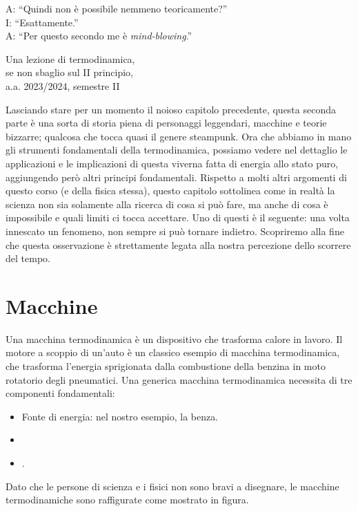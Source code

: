 \marginpar{\minitoc}

\epigraph{A: ``Quindi non è possibile nemmeno teoricamente?''\\I: ``Esattamente.''\\A: ``Per questo secondo me è \emph{mind-blowing}.''}{Una lezione di termodinamica,\\se non sbaglio sul II principio,\\a.a. 2023/2024, semestre II}

Lasciando stare per un momento il noioso capitolo precedente,
questa seconda parte è una sorta di storia piena di personaggi
leggendari, macchine e teorie bizzarre; qualcosa che tocca
quasi il genere steampunk. Ora che abbiamo in mano gli strumenti
fondamentali della termodinamica, possiamo vedere nel
dettaglio le applicazioni e le implicazioni di questa viverna
fatta di energia allo stato puro, aggiungendo però altri
principi fondamentali. Rispetto a molti altri
argomenti di questo corso (e della fisica stessa), questo
capitolo sottolinea come in realtà la scienza non sia
solamente alla ricerca di cosa si può fare, ma anche di
cosa è impossibile e quali limiti ci tocca accettare. Uno
di questi è il seguente: una
volta innescato un fenomeno, non sempre si può tornare indietro.
Scopriremo alla fine che questa osservazione è strettamente
legata alla nostra percezione dello scorrere del tempo.

\section{Macchine}
Una macchina termodinamica è un dispositivo che trasforma calore
in lavoro. Il motore a scoppio di un'auto è un classico esempio
di macchina termodinamica, che trasforma l'energia sprigionata
dalla combustione della benzina in moto rotatorio degli pneumatici.
Una generica macchina termodinamica necessita di tre componenti
fondamentali:

\begin{itemize}
    \item Fonte di energia: nel nostro esempio, la benza.
    \item 
    \item .
\end{itemize}


Dato che le persone di scienza e i fisici non sono bravi a disegnare,
le macchine termodinamiche sono raffigurate come mostrato in figura.

